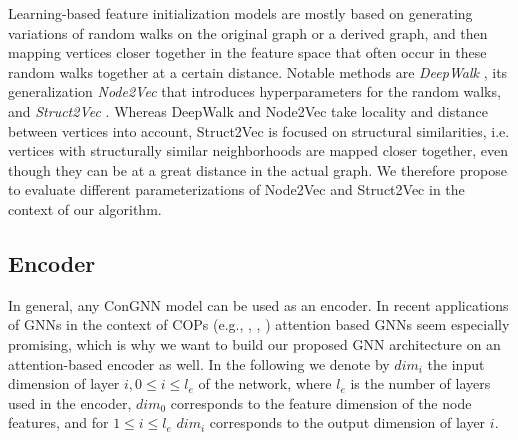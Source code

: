 \documentclass[draft,final]{vutinfth} %
\begin{document}
Learning-based feature initialization models are mostly based on generating variations of random walks on the original graph or a derived graph, and then mapping vertices closer together in the feature space that often occur in these random walks together at a certain distance. Notable methods are \emph{DeepWalk} \cite{Perozzi2014}, its generalization \emph{Node2Vec} \cite{GroverL16} that introduces hyperparameters for the random walks, and \emph{Struct2Vec} \cite{FigueiredoRS17}. Whereas DeepWalk and Node2Vec take locality and distance between vertices into account, Struct2Vec is focused on structural similarities, i.e. vertices with structurally similar neighborhoods are mapped closer together, even though they can be at a great distance in the actual graph. We therefore propose to evaluate different parameterizations of Node2Vec and Struct2Vec in the context of our algorithm. 

\subsection{Encoder}
In general, any ConGNN model can be used as an encoder. In recent applications of GNNs in the context of COPs (e.g., \cite{Kool2019}, \cite{Joshi2021}, \cite{Hudson2021}) attention based GNNs seem especially promising, which is why we want to build our proposed GNN architecture on an attention-based encoder as well. 
In the following we denote by $\mathit{dim}_i$ the input dimension of layer $i, 0 \leq i \leq l_e$ of the network, where $l_e$ is the number of layers used in the encoder, $dim_0$ corresponds to the feature dimension of the node features, and for $1 \leq i \leq l_e$ $\mathit{dim}_i$ corresponds to the output dimension of layer $i$. 

\end{document}
